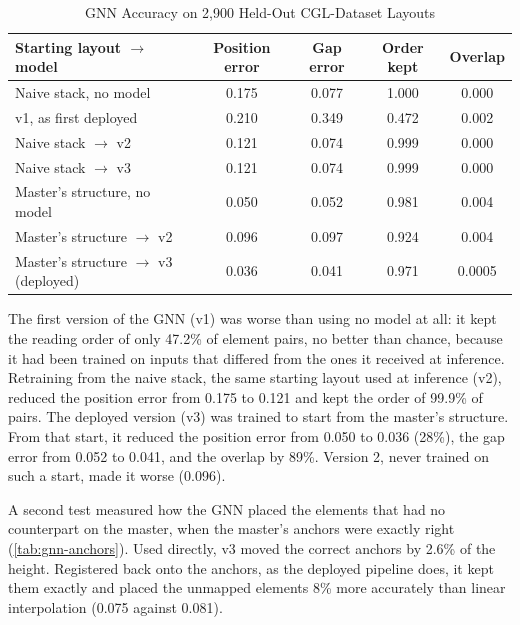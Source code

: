 \begin{refsection}
\begin{table}[ht]
\centering
\caption{GNN Accuracy on 2,900 Held-Out CGL-Dataset Layouts}
\label{tab:gnn-heldout}
\small
\begin{tabular}{l c c c c}
\hline
\textbf{Starting layout $\rightarrow$ model} & \textbf{Position error} & \textbf{Gap error} & \textbf{Order kept} & \textbf{Overlap} \\ \hline
Naive stack, no model & 0.175 & 0.077 & 1.000 & 0.000 \\
v1, as first deployed & 0.210 & 0.349 & 0.472 & 0.002 \\
Naive stack $\rightarrow$ v2 & 0.121 & 0.074 & 0.999 & 0.000 \\
Naive stack $\rightarrow$ v3 & 0.121 & 0.074 & 0.999 & 0.000 \\ \hline
Master's structure, no model & 0.050 & 0.052 & 0.981 & 0.004 \\
Master's structure $\rightarrow$ v2 & 0.096 & 0.097 & 0.924 & 0.004 \\
Master's structure $\rightarrow$ v3 (deployed) & 0.036 & 0.041 & 0.971 & 0.0005 \\ \hline
\end{tabular}
\end{table}

The first version of the GNN (v1) was worse than using no model at all: it kept the reading order of only 47.2\% of element pairs, no better than chance, because it had been trained on inputs that differed from the ones it received at inference. Retraining from the naive stack, the same starting layout used at inference (v2), reduced the position error from 0.175 to 0.121 and kept the order of 99.9\% of pairs. The deployed version (v3) was trained to start from the master's structure. From that start, it reduced the position error from 0.050 to 0.036 (28\%), the gap error from 0.052 to 0.041, and the overlap by 89\%. Version 2, never trained on such a start, made it worse (0.096).

A second test measured how the GNN placed the elements that had no counterpart on the master, when the master's anchors were exactly right (\ref{tab:gnn-anchors}). Used directly, v3 moved the correct anchors by 2.6\% of the height. Registered back onto the anchors, as the deployed pipeline does, it kept them exactly and placed the unmapped elements 8\% more accurately than linear interpolation (0.075 against 0.081).


\end{refsection}
